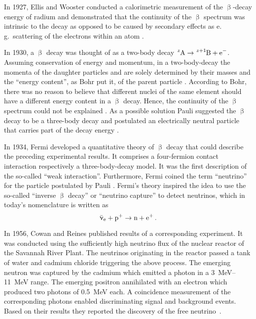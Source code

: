 In 1927, Ellis and Wooster conducted a calorimetric measurement of the $\upbeta$-decay energy of radium and demonstrated that the continuity of the $\upbeta$ spectrum was intrinsic to the decay as opposed to be caused by secondary effects as e.\,g.~scattering of the electrons within an atom \cite{Ellis:1}. 

In 1930, a $\upbeta$ decay was thought of as a two-body decay $\ce{^zA} \rightarrow \ce{^{z+1}B} + \ce{e^-}$. Assuming conservation of energy and momentum, in a two-body-decay the momenta of the daughter particles  and  are solely determined by their masses and the ``energy content'', as Bohr put it, of the parent particle . According to Bohr, there was no reason to believe that different nuclei of the same element  should have a different energy content in a $\upbeta$ decay. Hence, the continuity of the $\upbeta$ spectrum could not be explained \cite{Bohr:1}. As a possible solution Pauli suggested the $\upbeta$ decay to be a three-body decay and postulated an electrically neutral particle that carries part of the decay energy \cite{Pauli1930}. 

In 1934, Fermi developed a quantitative theory of $\upbeta$ decay that could describe the preceding experimental results. It comprises a four-fermion contact interaction respectively a three-body-decay model. It was the first description of the so-called ``weak interaction''. Furthermore, Fermi coined the term ``neutrino'' for the particle postulated by Pauli \cite{Fermi1934}. Fermi's theory inspired the idea to use the so-called ``inverse $\upbeta$ decay'' or ``neutrino capture'' to detect neutrinos, which in today's nomenclature is written as
\begin{equation*}
    \aeneutrino + \ce{p^+} \rightarrow \ce{n} + \ce{e^+} \fullstop
\end{equation*}

In 1956, Cowan and Reines published results of a corresponding experiment. It was conducted using the sufficiently high neutrino flux of the nuclear reactor of the Savannah River Plant. The neutrinos originating in the reactor passed a tank of water and cadmium chloride triggering the above process. The emerging neutron was captured by the cadmium which emitted a photon in a \SIrange{3}{11}{MeV} range. The emerging positron annihilated with an electron which produced two photons of \SI{0.5}{MeV} each. A coincidence measurement of the corresponding photons enabled discriminating signal and background events. Based on their results they reported the discovery of the free neutrino~\cite{Cowan103}. 

